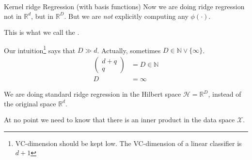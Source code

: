 \begin{example}[breakable]{Kernel ridge Regression (with basis functions)}{}
	Now we are doing ridge regression not in $\mathds R^d$, but in
	$\mathds R^D$. But we are \emph{not} explicitly computing
	any $\phi(\cdot)$.

	This is what we call the .

	Our intuition\footnote{VC-dimension should be kept low.
		The VC-dimension of a linear classifier is $d+1$
	}
	says that $D \gg d$. Actually, sometimes
	$D \in \mathds N \vee \{\infty\}$.
	\begin{align*}
		\begin{pmatrix}
			d + q \\
			q
		\end{pmatrix} & = D \in \mathds N \tag{Polynomial kernel} \\
		D               & = \infty \tag{RBF kernel}
	\end{align*}

	We are doing standard ridge regression in the Hilbert space
	$\mathcal H = \mathds R^D$, instead of the original space $\mathds R^d$.

	\begin{note}
		At no point we need to know that there is an inner product in the
		data space $\mathcal X$.
	\end{note}
\end{example}

